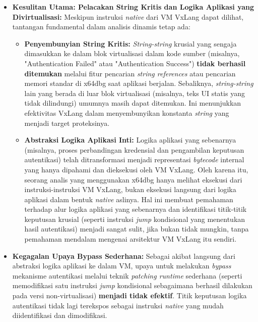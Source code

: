 \begin{itemize}
    \item \textbf{Kesulitan Utama: Pelacakan String Kritis dan Logika Aplikasi yang Divirtualisasi:} Meskipun instruksi \textit{native} dari VM VxLang dapat dilihat, tantangan fundamental dalam analisis dinamis tetap ada:
    \begin{itemize}
        \item \textbf{Penyembunyian String Kritis:} \textit{String-string} krusial yang sengaja dimasukkan ke dalam blok virtualisasi dalam kode sumber (misalnya, "Authentication Failed" atau "Authentication Success") \textbf{tidak berhasil ditemukan} melalui fitur pencarian \textit{string references} atau pencarian memori standar di x64dbg saat aplikasi berjalan. Sebaliknya, \textit{string-string} lain yang berada di luar blok virtualisasi (misalnya, teks UI statis yang tidak dilindungi) umumnya masih dapat ditemukan. Ini menunjukkan efektivitas VxLang dalam menyembunyikan konstanta \textit{string} yang menjadi target proteksinya.
        \item \textbf{Abstraksi Logika Aplikasi Inti:} Logika aplikasi yang sebenarnya (misalnya, proses perbandingan kredensial dan pengambilan keputusan autentikasi) telah ditransformasi menjadi representasi \textit{bytecode} internal yang hanya dipahami dan dieksekusi oleh VM VxLang. Oleh karena itu, seorang analis yang menggunakan x64dbg hanya melihat eksekusi dari instruksi-instruksi VM VxLang, bukan eksekusi langsung dari logika aplikasi dalam bentuk \textit{native} aslinya. Hal ini membuat pemahaman terhadap alur logika aplikasi yang sebenarnya dan identifikasi titik-titik keputusan krusial (seperti instruksi \textit{jump} kondisional yang menentukan hasil autentikasi) menjadi sangat sulit, jika bukan tidak mungkin, tanpa pemahaman mendalam mengenai arsitektur VM VxLang itu sendiri.
    \end{itemize}

    \item \textbf{Kegagalan Upaya Bypass Sederhana:} Sebagai akibat langsung dari abstraksi logika aplikasi ke dalam VM, upaya untuk melakukan \textit{bypass} mekanisme autentikasi melalui teknik \textit{patching runtime} sederhana (seperti memodifikasi satu instruksi \textit{jump} kondisional sebagaimana berhasil dilakukan pada versi non-virtualisasi) \textbf{menjadi tidak efektif}. Titik keputusan logika autentikasi tidak lagi terekspos sebagai instruksi \textit{native} yang mudah diidentifikasi dan dimodifikasi.

\end{itemize}

